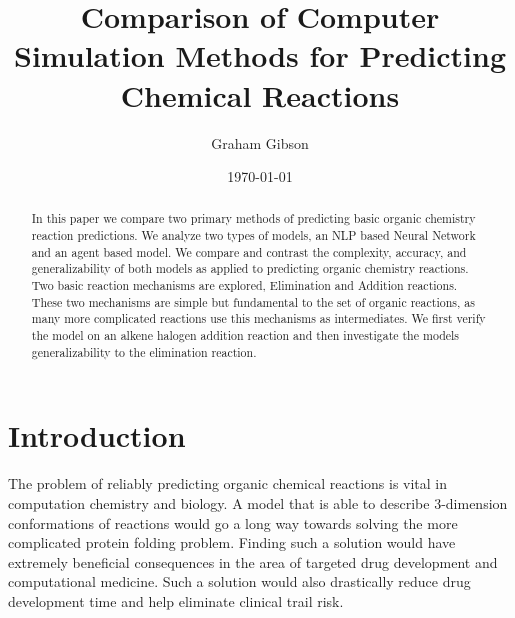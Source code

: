 \documentclass[aps,floatfix,prd,showpacs]{revtex4}
\begin{document}
\title{Comparison of Computer Simulation Methods for Predicting Chemical Reactions}
\author{Graham Gibson}

\date{\today}

\begin{abstract}

In this paper we compare two primary methods of predicting basic organic chemistry reaction predictions. We analyze two types of models, an NLP based Neural Network and an agent based model. We compare and contrast the complexity, accuracy, and generalizability of both models as applied to predicting organic chemistry reactions. Two basic reaction mechanisms are explored, Elimination and Addition reactions.  These two mechanisms are simple but fundamental to the set of organic reactions, as many more complicated reactions use this mechanisms as intermediates.  We first verify the model on an alkene halogen addition reaction and then investigate the models generalizability to the elimination reaction. 


\end{abstract}
\maketitle

\section{Introduction}

The problem of reliably predicting organic chemical reactions is vital in computation chemistry and biology. A model that is able to describe 3-dimension conformations of reactions would go a long way towards solving the more complicated protein folding problem. Finding such a solution would have extremely beneficial consequences in the area of targeted drug development and computational medicine. Such a solution would also drastically reduce drug development time and help eliminate clinical trail risk.
\end{document}
